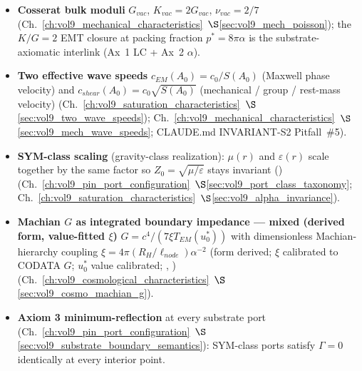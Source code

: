 \begin{itemize}
    \item \textbf{Cosserat bulk moduli} $G_{vac}$, $K_{vac} = 2 G_{vac}$, $\nu_{vac} = 2/7$ (Ch.~\ref{ch:vol9_mechanical_characteristics}~$\S$\ref{sec:vol9_mech_poisson}); the $K/G = 2$ EMT closure at packing fraction $p^* = 8\pi\alpha$ is the substrate-axiomatic interlink (Ax~1 LC + Ax~2 $\alpha$).
    \item \textbf{Two effective wave speeds} $c_{EM}(A_0) = c_0/S(A_0)$ (Maxwell phase velocity) and $c_{shear}(A_0) = c_0\sqrt{S(A_0)}$ (mechanical / group / rest-mass velocity) (Ch.~\ref{ch:vol9_saturation_characteristics}~$\S$\ref{sec:vol9_two_wave_speeds}); Ch.~\ref{ch:vol9_mechanical_characteristics}~$\S$\ref{sec:vol9_mech_wave_speeds}; CLAUDE.md INVARIANT-S2 Pitfall~\#5).
    \item \textbf{SYM-class scaling} (gravity-class realization): $\mu(r)$ and $\varepsilon(r)$ scale together by the same factor so $Z_0 = \sqrt{\mu/\varepsilon}$ stays invariant () (Ch.~\ref{ch:vol9_pin_port_configuration}~$\S$\ref{sec:vol9_port_class_taxonomy}; Ch.~\ref{ch:vol9_saturation_characteristics}~$\S$\ref{sec:vol9_alpha_invariance}).
    \item \textbf{Machian $G$ as integrated boundary impedance --- mixed (derived form, value-fitted $\xi$)} $G = c^4/(7\xi T_{EM}(u_0^*))$ with dimensionless Machian-hierarchy coupling $\xi = 4\pi(R_H/\ell_{node})\alpha^{-2}$ (form derived; $\xi$ calibrated to CODATA $G$; $u_0^*$ value calibrated; , ) (Ch.~\ref{ch:vol9_cosmological_characteristics}~$\S$\ref{sec:vol9_cosmo_machian_g}).
    \item \textbf{Axiom 3 minimum-reflection} at every substrate port (Ch.~\ref{ch:vol9_pin_port_configuration}~$\S$\ref{sec:vol9_substrate_boundary_semantics}): SYM-class ports satisfy $\Gamma = 0$ identically at every interior point.
\end{itemize}

